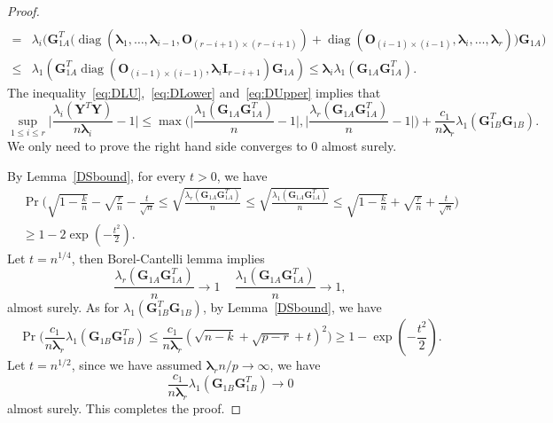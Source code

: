 \documentclass[12pt]{article} %
\DeclareMathOperator{\mydiag}{diag}
\newcommand{\bY}{\mathbf{Y}}
\newcommand{\bG}{\mathbf{G}}
\newcommand{\bO}{\mathbf{O}}
\newcommand{\bI}{\mathbf{I}}
\newcommand{\bfsym}[1]{\ensuremath{\boldsymbol{#1}}}
\def\blambda {\bfsym {\lambda}}
\theoremstyle{definition}
\begin{document}
\begin{proof}
\begin{equation}
\begin{aligned}
\\
=&\lambda_i\Big(
\bG_{1A}^T \big(
\mydiag(\blambda_1,\ldots,\blambda_{i-1},\bO_{(r-i+1)\times(r-i+1)})+
\mydiag(\bO_{(i-1)\times(i-1)},\blambda_i,\ldots,\blambda_r)
\big)
\bG_{1A}
\Big)\\
    \leq&
\lambda_1(\bG_{1A}^T \mydiag(\bO_{(i-1)\times(i-1)},\blambda_i \bI_{r-i+1}) \bG_{1A})
\leq  \blambda_i \lambda_1(\bG_{1A}\bG_{1A}^T).
\end{aligned}
\end{equation}
    The inequality~\eqref{eq:DLU},~\eqref{eq:DLower} and~\eqref{eq:DUpper} implies that
    $$
   \sup_{1\leq i \leq r} \Big|\frac{\lambda_i(\bY^T \bY)}{n\blambda_i}-1\Big|\leq
    \max\Big(\Big|\frac{\lambda_1(\bG_{1A}\bG_{1A}^T)}{n}-1\Big|,\Big|\frac{\lambda_r(\bG_{1A}\bG_{1A}^T)}{n}-1\Big|\Big)+\frac{c_1}{n\blambda_r}\lambda_1(\bG_{1B}^T \bG_{1B}).
    $$
    We only need to prove the right hand side converges to $0$ almost surely.

    By Lemma~\ref{DSbound}, for every $t>0$, we have
    $$
    \begin{aligned}
        &\Pr\Big(\sqrt{1-\frac{k}{n}}-\sqrt{\frac{r}{n}}-\frac{t}{\sqrt{n}}\leq \sqrt{\frac{\lambda_r(\bG_{1A}\bG_{1A}^T)}{n}}\leq \sqrt{\frac{\lambda_1(\bG_{1A}\bG_{1A}^T)}{n}}\leq \sqrt{1-\frac{k}{n}}+\sqrt{\frac{r}{n}}+\frac{t}{\sqrt{n}} \Big) \\
        &\geq 1-2\exp(-\frac{t^2}{2}).
    \end{aligned}
    $$
    Let $t=n^{1/4}$, then Borel-Cantelli lemma implies 
    $$
    \frac{\lambda_r(\bG_{1A}\bG_{1A}^T)}{n}\to 1\,\quad
    \frac{\lambda_1(\bG_{1A}\bG_{1A}^T)}{n}\to 1,
    $$
    almost surely.
    As for $\lambda_1(\bG_{1B}^T \bG_{1B})$, by Lemma~\ref{DSbound}, we have
    $$
   \Pr\Big( \frac{c_1}{n\blambda_r}{\lambda_1(\bG_{1B}\bG_{1B}^T)}\leq \frac{c_1}{n\blambda_r}(\sqrt{n-k}+\sqrt{p-r}+t)^2 \Big) 
   \geq 1-\exp(-\frac{t^2}{2}).
    $$
Let $t=n^{1/2}$, since we have assumed $\blambda_r n/p\to \infty$, we have $$\frac{c_1}{n\blambda_r}{\lambda_1(\bG_{1B}\bG_{1B}^T)}\to 0$$
almost surely.
This completes the proof.
\end{proof}
\end{document}
